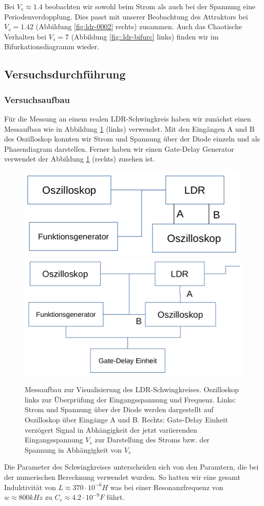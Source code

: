 \documentclass[12pt,a4paper]{article}
\begin{document}
Bei $V_s\approx1.4$ beobachten wir sowohl beim Strom als auch bei der Spannung eine Periodenverdopplung. Dies passt mit unserer Beobachtung des Attraktors bei $V_s=1.42$ (Abbildung \ref{fig:ldr-0002} rechts) zusammen. Auch das Chaotische Verhalten bei $V_s=7$ (Abbildung \ref{fig::ldr-bifurc} links) finden wir im Bifurkationsdiagramm wieder.


\subsection { Versuchsdurchführung }
\subsubsection{ Versuchsaufbau}
Für die Messung an einem realen LDR-Schwingkreis haben wir zunächst einen Messaufbau wie in Abbildung \ref{fig:ldr-aufbau1} (links) verwendet. Mit den Eingängen A und B des Oszilloskop konnten wir Strom und Spannung über der Diode einzeln und als Phasendiagram darstellen. Ferner haben wir einen Gate-Delay Generator verwendet der Abbildung \ref{fig:ldr-aufbau1} (rechts) zusehen ist.
\begin{figure}[!htbp]
\includegraphics[scale=0.4]{aufbau1}
\includegraphics[scale=0.38]{aufbau2}
\caption{Messaufbau zur Visualisierung des LDR-Schwingkreises. Oszilloskop links zur Überprüfung der Eingangsspannung und Frequenz. Links: Strom und Spannung über der Diode werden dargestellt auf Oszilloskop über Eingänge A und B. Rechts: Gate-Delay Einheit verzögert Signal in Abhängigkeit der jetzt variierenden Eingangsspannung $V_s$ zur Darstellung des Stroms bzw. der Spannung in Abhängigkeit von $V_s$ }
\label{fig:ldr-aufbau1}
\end{figure}
Die Parameter des Schwingkreises unterscheiden sich von den Paramtern, die bei der numerischen Berechnung verwendet wurden. So hatten wir eine gesamt Induktivität von $L\approx370\cdot10^{-6}H$ was bei einer Resonanzfrequenz von $w\approx800kHz$ zu $C_r\approx4.2\cdot10^{-9}F$ führt.
\end{document}
